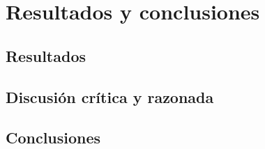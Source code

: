 
\chapter{Resultados y conclusiones}
\section{Resultados}
\section{Discusión crítica y razonada}
\section{Conclusiones}%